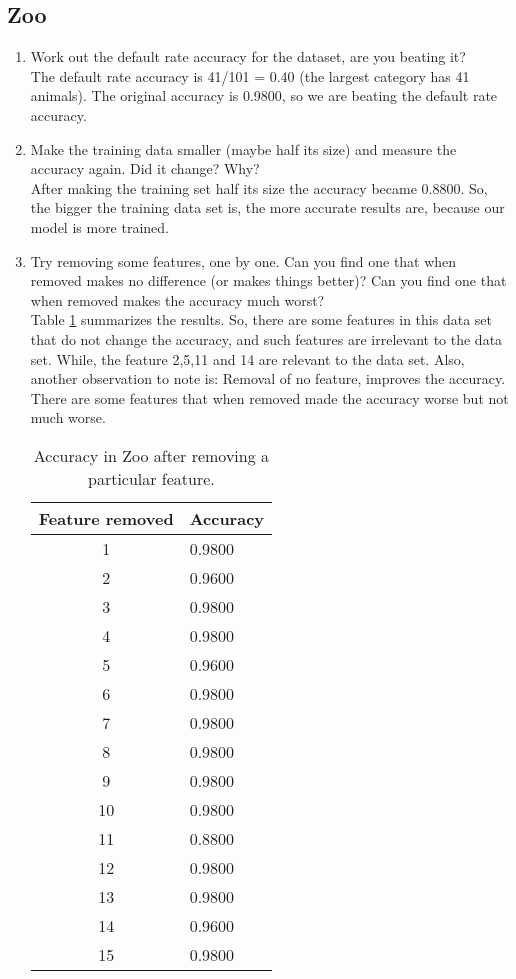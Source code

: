 \documentclass[10pt]{scrartcl}
\begin{document}
\subsection{Zoo}
\begin{enumerate}
 \item Work out the default rate accuracy for the dataset, are you beating it? \\
 The default rate accuracy is 41/101 = 0.40 (the largest category has 41 animals). The original accuracy is 0.9800, so we are beating the default rate accuracy. 
 
 \item Make the training data smaller (maybe half its size) and measure the accuracy again. Did it change? Why? \\ 
 After making the training set half its size the accuracy became 0.8800.  So, the bigger the training data set is, the more accurate results are, because our model is more trained. 
 
 \item Try removing some features, one by one. Can you find one that when removed makes no difference (or makes things better)? Can you find one that when removed makes the accuracy much worst? \\
 Table \ref{tab:acc1} summarizes the results. So, there are some features in this data set that do not change the accuracy, and such features are irrelevant to the data set. While, the feature 2,5,11 and 14 are relevant to the data set. Also, another observation to note is: Removal of no feature, improves the accuracy. There are some features that when removed made the accuracy worse but not much worse.  

 \begin{table}[h!]
 \centering
 \begin{tabular}{cl}
  \toprule
  \textbf{Feature removed} & \textbf{Accuracy} \\
  \midrule
  1  & 0.9800 \\ 
  2  & 0.9600 \\  
  3  & 0.9800 \\  
  4  & 0.9800 \\  
  5  & 0.9600 \\  
  6  & 0.9800 \\  
  7  & 0.9800 \\  
  8  & 0.9800 \\  
  9  & 0.9800 \\  
  10 & 0.9800 \\ 
  11 & 0.8800 \\ 
  12 & 0.9800 \\ 
  13 & 0.9800 \\ 
  14 & 0.9600 \\ 
  15 & 0.9800 \\ 
  \bottomrule
 \end{tabular}
 \caption{Accuracy in Zoo after removing a particular feature.}\label{tab:acc1}
 \end{table}
 

\end{enumerate}
\end{document}
